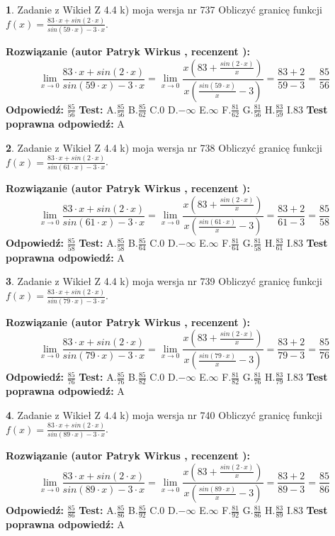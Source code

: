 \documentclass[12pt, a4paper]{article}
\theoremstyle{definition} %
\newtheorem{zad}{}
\newcommand{\zadStart}[1]{\begin{zad}#1\newline}
\newcommand{\zadStop}{\end{zad}}
\newcommand{\rozwStart}[2]{\noindent \textbf{Rozwiązanie (autor #1 , recenzent #2): }\newline}
\newcommand{\rozwStop}{\newline}
\newcommand{\odpStart}{\noindent \textbf{Odpowiedź:}\newline}
\newcommand{\odpStop}{\newline}
\newcommand{\testStart}{\noindent \textbf{Test:}\newline}
\newcommand{\testStop}{\newline}
\newcommand{\kluczStart}{\noindent \textbf{Test poprawna odpowiedź:}\newline}
\newcommand{\kluczStop}{\newline}
\begin{document}
\zadStart{Zadanie z Wikieł Z 4.4 k) moja wersja nr 737}
Obliczyć granicę funkcji $f(x)=\frac{83\cdot x +sin(2\cdot x)}{sin(59\cdot x) -3\cdot x}$.
\zadStop
\rozwStart{Patryk Wirkus}{}
$$\lim\limits_{x\to 0}\frac{83\cdot x +sin(2\cdot x)}{sin(59\cdot x) -3\cdot x}
=\lim\limits_{x\to 0}\frac{x(83+\frac{sin(2\cdot x)}{x})}{x(\frac{sin(59\cdot x)}{x}-3)}
=\frac{83+2}{59-3} = \frac{85}{56}$$
\rozwStop
\odpStart
$\frac{85}{56}$
\odpStop
\testStart
A.$\frac{85}{56}$
B.$\frac{85}{62}$
C.$0$
D.$-\infty$
E.$\infty$
F.$\frac{81}{62}$
G.$\frac{81}{56}$
H.$\frac{83}{59}$
I.$83$
\testStop
\kluczStart
A
\kluczStop



\zadStart{Zadanie z Wikieł Z 4.4 k) moja wersja nr 738}
Obliczyć granicę funkcji $f(x)=\frac{83\cdot x +sin(2\cdot x)}{sin(61\cdot x) -3\cdot x}$.
\zadStop
\rozwStart{Patryk Wirkus}{}
$$\lim\limits_{x\to 0}\frac{83\cdot x +sin(2\cdot x)}{sin(61\cdot x) -3\cdot x}
=\lim\limits_{x\to 0}\frac{x(83+\frac{sin(2\cdot x)}{x})}{x(\frac{sin(61\cdot x)}{x}-3)}
=\frac{83+2}{61-3} = \frac{85}{58}$$
\rozwStop
\odpStart
$\frac{85}{58}$
\odpStop
\testStart
A.$\frac{85}{58}$
B.$\frac{85}{64}$
C.$0$
D.$-\infty$
E.$\infty$
F.$\frac{81}{64}$
G.$\frac{81}{58}$
H.$\frac{83}{61}$
I.$83$
\testStop
\kluczStart
A
\kluczStop



\zadStart{Zadanie z Wikieł Z 4.4 k) moja wersja nr 739}
Obliczyć granicę funkcji $f(x)=\frac{83\cdot x +sin(2\cdot x)}{sin(79\cdot x) -3\cdot x}$.
\zadStop
\rozwStart{Patryk Wirkus}{}
$$\lim\limits_{x\to 0}\frac{83\cdot x +sin(2\cdot x)}{sin(79\cdot x) -3\cdot x}
=\lim\limits_{x\to 0}\frac{x(83+\frac{sin(2\cdot x)}{x})}{x(\frac{sin(79\cdot x)}{x}-3)}
=\frac{83+2}{79-3} = \frac{85}{76}$$
\rozwStop
\odpStart
$\frac{85}{76}$
\odpStop
\testStart
A.$\frac{85}{76}$
B.$\frac{85}{82}$
C.$0$
D.$-\infty$
E.$\infty$
F.$\frac{81}{82}$
G.$\frac{81}{76}$
H.$\frac{83}{79}$
I.$83$
\testStop
\kluczStart
A
\kluczStop



\zadStart{Zadanie z Wikieł Z 4.4 k) moja wersja nr 740}
Obliczyć granicę funkcji $f(x)=\frac{83\cdot x +sin(2\cdot x)}{sin(89\cdot x) -3\cdot x}$.
\zadStop
\rozwStart{Patryk Wirkus}{}
$$\lim\limits_{x\to 0}\frac{83\cdot x +sin(2\cdot x)}{sin(89\cdot x) -3\cdot x}
=\lim\limits_{x\to 0}\frac{x(83+\frac{sin(2\cdot x)}{x})}{x(\frac{sin(89\cdot x)}{x}-3)}
=\frac{83+2}{89-3} = \frac{85}{86}$$
\rozwStop
\odpStart
$\frac{85}{86}$
\odpStop
\testStart
A.$\frac{85}{86}$
B.$\frac{85}{92}$
C.$0$
D.$-\infty$
E.$\infty$
F.$\frac{81}{92}$
G.$\frac{81}{86}$
H.$\frac{83}{89}$
I.$83$
\testStop
\kluczStart
A
\kluczStop
\end{document}

